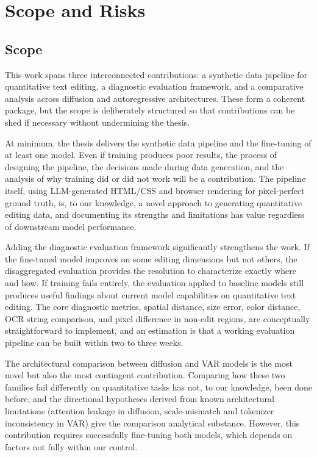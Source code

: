 \chapter{Scope and Risks} \label{Scope and Risks}

\section{Scope}

\label{Scope}

This work spans three interconnected contributions: a synthetic data pipeline for quantitative text editing, a diagnostic evaluation framework, and a comparative analysis across diffusion and autoregressive architectures. These form a coherent package, but the scope is deliberately structured so that contributions can be shed if necessary without undermining the thesis.

At minimum, the thesis delivers the synthetic data pipeline and the fine-tuning of at least one model. Even if training produces poor results, the process of designing the pipeline, the decisions made during data generation, and the analysis of why training did or did not work will be a contribution. The pipeline itself, using LLM-generated HTML/CSS and browser rendering for pixel-perfect ground truth, is, to our knowledge, a novel approach to generating quantitative editing data, and documenting its strengths and limitations has value regardless of downstream model performance.

Adding the diagnostic evaluation framework significantly strengthens the work. If the fine-tuned model improves on some editing dimensions but not others, the disaggregated evaluation provides the resolution to characterize exactly where and how. If training fails entirely, the evaluation applied to baseline models still produces useful findings about current model capabilities on quantitative text editing. The core diagnostic metrics, spatial distance, size error, color distance, OCR string comparison, and pixel difference in non-edit regions, are conceptually straightforward to implement, and an estimation is that a working evaluation pipeline can be built within two to three weeks.

The architectural comparison between diffusion and VAR models is the most novel but also the most contingent contribution. Comparing how these two families fail differently on quantitative tasks has not, to our knowledge, been done before, and the directional hypotheses derived from known architectural limitations (attention leakage in diffusion, scale-mismatch and tokenizer inconsistency in VAR) give the comparison analytical substance. However, this contribution requires successfully fine-tuning both models, which depends on factors not fully within our control.


